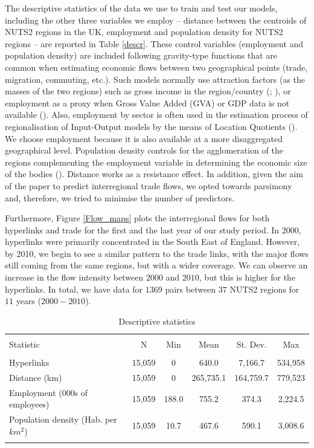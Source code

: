 \documentclass[]{interact}
\theoremstyle{plain}%
\theoremstyle{definition}
\theoremstyle{remark}
\begin{document}
The descriptive statistics of the data we use to train and test our
models, including the other three variables we employ -- distance
between the centroids of NUTS2 regions in the UK, employment and
population density for NUTS2 regions -- are reported in Table
\ref{descr}. These control variables (employment and population density)
are included following gravity-type functions that are common when
estimating economic flows between two geographical points (trade,
migration, commuting, etc.). Such models normally use attraction factors
(as the masses of the two regions) such as gross income in the
region/country (\citet{anderson2003gravity};
\citet{riddington2006comparison}), or employment as a proxy when Gross
Value Added (GVA) or GDP data is not available
(\citet{kimura2006gravity}). Also, employment by sector is often used in
the estimation process of regionalisation of Input-Output models by the
means of Location Quotients (\citet{flegg2000regional}). We choose
employment because it is also available at a more disaggregated
geographical level. Population density controls for the agglomeration of
the regions complementing the employment variable in determining the
economic size of the bodies (\citet{greene2013export}). Distance works
as a resistance effect. In addition, given the aim of the paper to
predict interregional trade flows, we opted towards parsimony and,
therefore, we tried to minimise the number of predictors.

Furthermore, Figure \ref{Flow_maps} plots the interregional flows for
both hyperlinks and trade for the first and the last year of our study
period. In 2000, hyperlinks were primarily concentrated in the South
East of England. However, by 2010, we begin to see a similar pattern to
the trade links, with the major flows still coming from the same
regions, but with a wider coverage. We can observe an increase in the
flow intensity between \(2000\) and \(2010\), but this is higher for the
hyperlinks. In total, we have data for \(1369\) pairs between \(37\)
NUTS2 regions for \(11\) years (\(2000-2010\)).

\begin{table}[!htbp] \centering 
  \caption{Descriptive statistics\label{descr}} 
  \label{} 
\footnotesize 
\begin{tabular}{@{\extracolsep{1pt}}lccccc} 
\\[-1.8ex]\hline 
\hline \\[-1.8ex] 
Statistic & \multicolumn{1}{c}{N} & \multicolumn{1}{c}{Min} & \multicolumn{1}{c}{Mean} & \multicolumn{1}{c}{St. Dev.} & \multicolumn{1}{c}{Max} \\ 
\hline \\[-1.8ex] 
Hyperlinks & 15,059 & 0 & 640.0 & 7,166.7 & 534,958 \\ 
Distance (km) & 15,059 & 0 & 265,735.1 & 164,759.7 & 779,523 \\ 
Employment (000s of employees) & 15,059 & 188.0 & 755.2 & 374.3 & 2,224.5 \\ 
Population density (Hab. per $km^2$) & 15,059 & 10.7 & 467.6 & 590.1 & 3,008.6 \\ 
\hline \\[-1.8ex] 
\end{tabular} 
\end{table}
\end{document}
